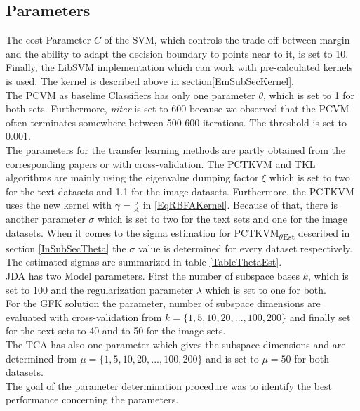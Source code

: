 \subsection{Parameters}
The cost Parameter $C$ of the \acs{SVM}, which controls the trade-off between margin and the ability to adapt the decision boundary to points near to it, is set to 10. \cite[p. 421-422]{TrevorHastie.2009}
Finally, the LibSVM implementation which can work with pre-calculated kernels is used. The kernel is described above in section\ref{EmSubSecKernel}.\\
The PCVM as baseline Classifiers has only one parameter $\theta$, which is set to 1 for both sets.
Furthermore, \textit{niter} is set to 600 because we observed that the \acs{PCVM} often terminates somewhere between 500-600 iterations. The threshold is set to 0.001.\\
The parameters for the transfer learning methods are partly obtained from the corresponding papers or with cross-validation. 
The \acs{PCTKVM} and \acs{TKL} algorithms are mainly using the eigenvalue dumping factor $\xi$ which is set to two for the text datasets and 1.1 for the image datasets.\cite{Long.2015}
Furthermore, the \acs{PCTKVM} uses the new kernel with $\gamma=\frac{\sigma}{A}$ in \eqref{EqRBFAKernel}.
Because of that, there is another parameter $\sigma$ which is set to two for the text sets and one for the image datasets.
When it comes to the sigma estimation for \acs{PCTKVM}\textsubscript{$\theta$Est} described in section \ref{InSubSecTheta} the $\sigma$ value is determined for every dataset respectively.
The estimated sigmas are summarized in table \ref{TableThetaEst}. \\
\acs{JDA} has two Model parameters.
First the number of subspace bases $k$, which is set to 100 and the regularization parameter $\lambda $ which is set to one for both.\cite{Long.}\\
For the \acs{GFK} solution the parameter, number of subspace dimensions are evaluated with cross-validation from $k=\{1,5,10,20,...,100,200\}$ and finally set for the text sets to 40 and to 50 for the image sets.\\
The \acs{TCA} has also one parameter which gives the subspace dimensions and are determined from $\mu=\{1,5,10,20,...,100,200\}$ and is set to $\mu=50$ for both datasets.\\
The goal of the parameter determination procedure was to identify the best performance concerning the parameters.
